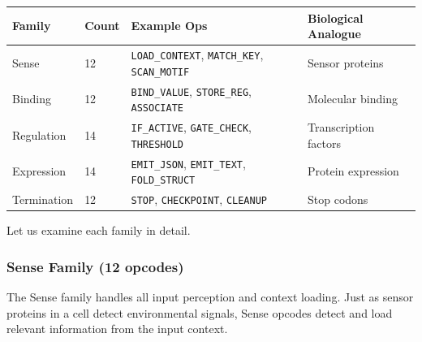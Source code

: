 \begin{center}
\renewcommand{\arraystretch}{1.15}
\begin{tabularx}{0.97\textwidth}{L{2.5cm} L{1.2cm} L{3.2cm} Y}
\toprule
\textbf{Family} & \textbf{Count} & \textbf{Example Ops} & \textbf{Biological Analogue} \\
\midrule
Sense & 12 & \texttt{LOAD\_CONTEXT}, \texttt{MATCH\_KEY}, \texttt{SCAN\_MOTIF} & Sensor proteins \\
Binding & 12 & \texttt{BIND\_VALUE}, \texttt{STORE\_REG}, \texttt{ASSOCIATE} & Molecular binding \\
Regulation & 14 & \texttt{IF\_ACTIVE}, \texttt{GATE\_CHECK}, \texttt{THRESHOLD} & Transcription factors \\
Expression & 14 & \texttt{EMIT\_JSON}, \texttt{EMIT\_TEXT}, \texttt{FOLD\_STRUCT} & Protein expression \\
Termination & 12 & \texttt{STOP}, \texttt{CHECKPOINT}, \texttt{CLEANUP} & Stop codons \\
\bottomrule
\end{tabularx}
\end{center}

Let us examine each family in detail.

\subsubsection{Sense Family (12 opcodes)}

The Sense family handles all input perception and context loading. Just as sensor proteins in a cell detect environmental signals, Sense opcodes detect and load relevant information from the input context.

